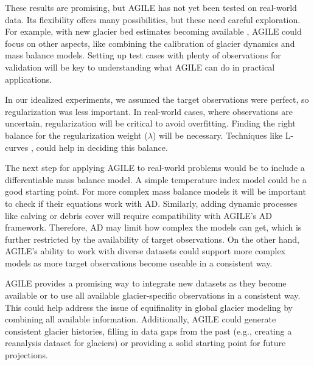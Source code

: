 \documentclass[journal abbreviation, manuscript]{copernicus}
\begin{document}
These results are promising, but AGILE has not yet been tested on real-world data. Its flexibility offers many possibilities, but these need careful exploration. For example, with new glacier bed estimates becoming available \citep[e.g.,][]{Cook2023, vanPelt2025}, AGILE could focus on other aspects, like combining the calibration of glacier dynamics and mass balance models. Setting up test cases with plenty of observations for validation will be key to understanding what AGILE can do in practical applications.

In our idealized experiments, we assumed the target observations were perfect, so regularization was less important. In real-world cases, where observations are uncertain, regularization will be critical to avoid overfitting. Finding the right balance for the regularization weight ($\lambda$) will be necessary. Techniques like L-curves \citep[see, e.g.,][]{Hansen1992, GilletChaulet2012, Recinos2023, Wolovick2023}, could help in deciding this balance.

The next step for applying AGILE to real-world problems would be to include a differentiable mass balance model. A simple temperature index model \citep[e.g.,][]{Marzeion2012} could be a good starting point. For more complex mass balance models \citep[e.g. PyGEM][]{Rounce2020} it will be important to check if their equations work with AD. Similarly, adding dynamic processes like calving or debris cover will require compatibility with AGILE’s AD framework. Therefore, AD may limit how complex the models can get, which is further restricted by the availability of target observations. On the other hand, AGILE’s ability to work with diverse datasets could support more complex models as more target observations become useable in a consistent way.

AGILE provides a promising way to integrate new datasets as they become available or to use all available glacier-specific observations in a consistent way. This could help address the issue of equifinality in global glacier modeling \citep[e.g.][]{Rounce2020} by combining all available information. Additionally, AGILE could generate consistent glacier histories, filling in data gaps from the past (e.g., creating a reanalysis dataset for glaciers) or providing a solid starting point for future projections.

\end{document}
